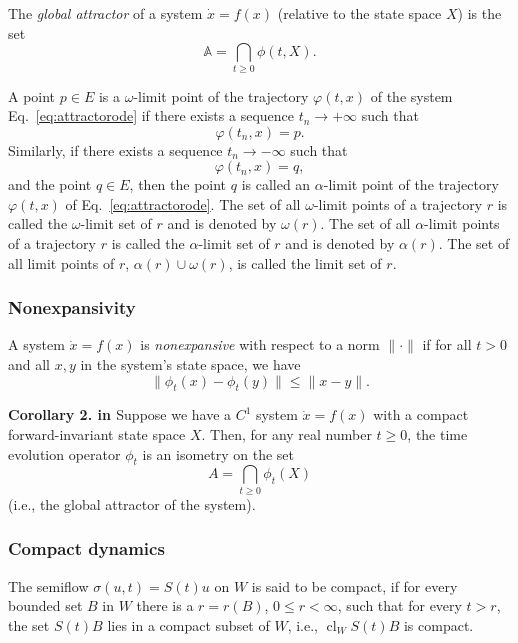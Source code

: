 \documentclass{article}
\newcommand{\cl}{\operatorname{cl}}
\newcounter{ct}
\begin{document}
\begin{definition}
The \textit{global attractor} of a system \( \dot{x} = f(x) \) (relative to the state space \( X \)) is the set  
\[
\mathbb{A} = \bigcap_{t \geq 0} \phi(t,X).
\]
\end{definition}

\begin{definition}\label{def:omega}
A point \( p \in E \) is a \(\omega\)-limit point of the trajectory \( \varphi(t, x) \) of the system Eq.~\ref{eq:attractorode} if there exists a sequence \( t_n \to +\infty \) such that
\[
\varphi(t_n, x) = p.
\]
Similarly, if there exists a sequence \( t_n \to -\infty \) such that
\[
\varphi(t_n, x) = q,
\]
and the point \( q \in E \), then the point \( q \) is called an \(\alpha\)-limit point of the trajectory \( \varphi(t, x) \) of  Eq.~\ref{eq:attractorode}. The set of all \(\omega\)-limit points of a trajectory \( r \) is called the \(\omega\)-limit set of \( r \) and is denoted by \( \omega(r) \). The set of all \(\alpha\)-limit points of a trajectory \( r \) is called the \(\alpha\)-limit set of \( r \) and is denoted by \( \alpha(r) \). The set of all limit points of \( r \), \( \alpha(r) \cup \omega(r) \), is called the limit set of \( r \).
\end{definition}

\subsubsection{Nonexpansivity}
\begin{definition}\label{def:nonexpansive}
A system \( \dot{x} = f(x) \) is \textit{nonexpansive} with respect to a norm \( \|\cdot\| \) if for all \( t > 0 \) and all \( x, y \) in the system’s state space, we have  
\[
\|\phi_t(x) - \phi_t(y)\| \leq \|x - y\|.
\]
\end{definition}


\textbf{Corollary 2. in  \citep{duvall2024remark}} Suppose we have a \( C^1 \) system \( \dot{x} = f(x) \) with a compact forward-invariant state space \( X \). Then, for any real number \( t \geq 0 \), the time evolution operator \( \phi_t \) is an isometry on the set  
\[
A = \bigcap_{t \geq 0} \phi_t(X)
\]  
(i.e., the global attractor of the system).


\subsubsection{Compact dynamics}
The semiflow $\sigma(u, t) = S(t)u$ on $W$ is said to be compact, if for every bounded set $B$ in $W$ there is a $r = r(B)$, $0 \leq r < \infty$, such that for every $t> r$, the set $S(t)B$ lies in a compact subset of $W$, i.e., $\cl_WS(t)B$ is compact. 
\end{document}
